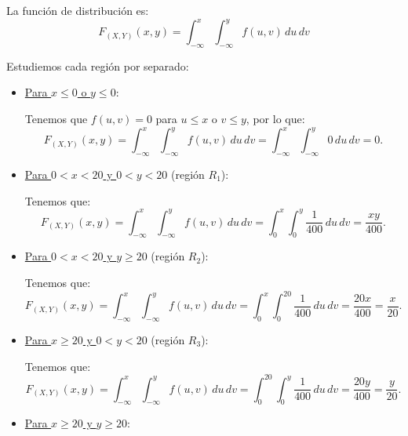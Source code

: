 \begin{ejercicio}
    La función de distribución es:
    \begin{equation*}
        F_{(X,Y)}(x, y) = \int_{-\infty}^x \int_{-\infty}^y f(u, v) \, du \, dv
    \end{equation*}

    Estudiemos cada región por separado:
    \begin{itemize}
        \item \ul{Para $x\leq 0$ o $y\leq 0$}:
        
        Tenemos que $f(u, v) = 0$ para $u\leq x$ o $v\leq y$, por lo que:
        \begin{equation*}
            F_{(X,Y)}(x, y) = \int_{-\infty}^x \int_{-\infty}^y f(u, v) \, du \, dv =
            \int_{-\infty}^x \int_{-\infty}^y 0 \, du \, dv = 0.
        \end{equation*}

        \item \ul{Para $0 < x < 20$ y $0 < y < 20$} (región $R_1$):
        
        Tenemos que:
        \begin{equation*}
            F_{(X,Y)}(x, y) = \int_{-\infty}^x \int_{-\infty}^y f(u, v) \, du \, dv =
            \int_{0}^x \int_{0}^y \frac{1}{400} \, du \, dv = \frac{xy}{400}.
        \end{equation*}

        \item \ul{Para $0 < x < 20$ y $y \geq 20$} (región $R_2$):
        
        Tenemos que:
        \begin{equation*}
            F_{(X,Y)}(x, y) = \int_{-\infty}^x \int_{-\infty}^y f(u, v) \, du \, dv =
            \int_{0}^x \int_{0}^{20} \frac{1}{400} \, du \, dv = \frac{20x}{400} = \frac{x}{20}.
        \end{equation*}

        \item \ul{Para $x \geq 20$ y $0 < y < 20$} (región $R_3$):
        
        Tenemos que:
        \begin{equation*}
            F_{(X,Y)}(x, y) = \int_{-\infty}^x \int_{-\infty}^y f(u, v) \, du \, dv =
            \int_{0}^{20} \int_{0}^y \frac{1}{400} \, du \, dv = \frac{20y}{400} = \frac{y}{20}.
        \end{equation*}

        \item \ul{Para $x \geq 20$ y $y \geq 20$}:
        

\end{itemize}
\end{ejercicio}
